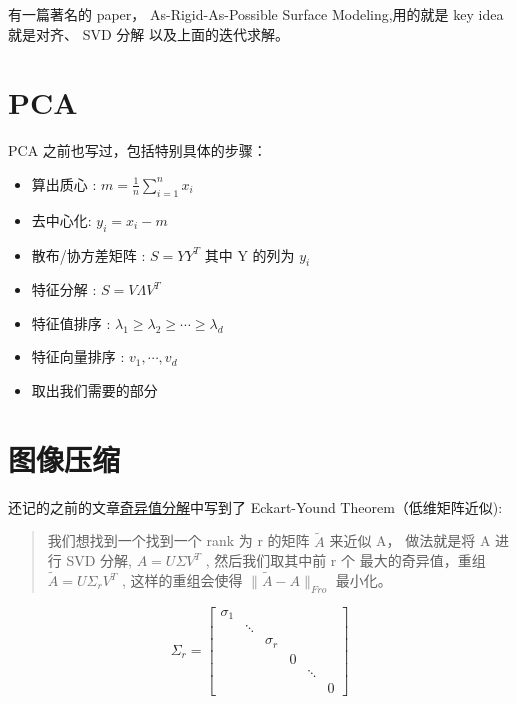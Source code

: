 \documentclass[
]{book}
\providecommand{\tightlist}{%
  \setlength{\itemsep}{0pt}\setlength{\parskip}{0pt}}
\begin{document}
有一篇著名的 paper， As-Rigid-As-Possible Surface Modeling,用的就是 key idea 就是对齐、 SVD 分解 以及上面的迭代求解。

\hypertarget{pca}{%
\section{PCA}\label{pca}}

PCA 之前也写过，包括特别具体的步骤：

\begin{itemize}
\tightlist
\item
  算出质心 : \(m = \frac{1}{n} \sum_{i=1}^n x_i\)
\item
  去中心化: \(y_i = x_i - m\)
\item
  散布/协方差矩阵 : \(S = YY^T\) 其中 Y 的列为 \(y_i\)
\item
  特征分解 : \(S = V \Lambda V^T\)
\item
  特征值排序 : \(\lambda_1 \ge \lambda_2 \ge \cdots \ge \lambda_d\)
\item
  特征向量排序 : \(v_1, \cdots, v_d\)
\item
  取出我们需要的部分
\end{itemize}

\hypertarget{ux56feux50cfux538bux7f29}{%
\section{图像压缩}\label{ux56feux50cfux538bux7f29}}

还记的之前的文章\href{https://zhuanlan.zhihu.com/p/114550672}{奇异值分解}中写到了 Eckart-Yound Theorem（低维矩阵近似):

\begin{quote}
我们想找到一个找到一个 rank 为 r 的矩阵 \(\tilde{A}\) 来近似 A， 做法就是将 A 进行 SVD 分解, \(A = U \Sigma V^T\) , 然后我们取其中前 r 个 最大的奇异值，重组 \(\tilde{A} = U \Sigma_r V^T\) , 这样的重组会使得 \(\parallel \tilde{A} - A \parallel_{Fro}\) 最小化。
\end{quote}

\[
\Sigma_r = \begin{bmatrix} \sigma_1 & &  & &  \\  & \ddots  &  &  \\  &  & \sigma_r & & \\  &  &  & 0 & \\ &   &  &  & \ddots \\ &   &  & & & 0 \end{bmatrix} 
\]
\end{document}
